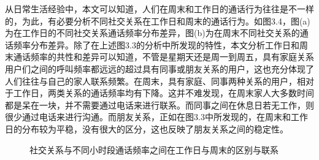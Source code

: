 从日常生活经验中，本文可以知道，人们在周末和工作日的通话行为往往是不一样的，为此，有必要分析不同社交关系在工作日和周末的通话行为。如图3.4，图(a)为在工作日的不同社交关系通话频率分布差异，图(b)为在周末不同社交关系的通话频率分布差异。除了在上述图3.3的分析中所发现的特性，本文分析工作日和周末通话频率的共性和差异可以知道，不管是星期天还是周一到周五，具有家庭关系用户们之间的呼叫频率都远远的超过具有同事或朋友关系的用户，这也充分体现了人们往往与自己的家人联系频繁。在周末，具有家庭、同事两种关系的用户，相对于工作日，两类关系的通话频率均有下降。这并不难发现，在周末家人大多数时间都是呆在一块，并不需要通过电话来进行联系。而同事之间在休息日若无工作，则很少通过电话来进行沟通。而朋友关系，正如在图3.3中所发现的，在周末和工作日的分布较为平稳，没有很大的区分，这也反映了朋友关系之间的稳定性。


\begin{figure}[!ht]
    \centering
    \hspace{7em} %
    \caption{社交关系与不同小时段通话频率之间在工作日与周末的区别与联系}
    \label{fig-sub}
\end{figure}

